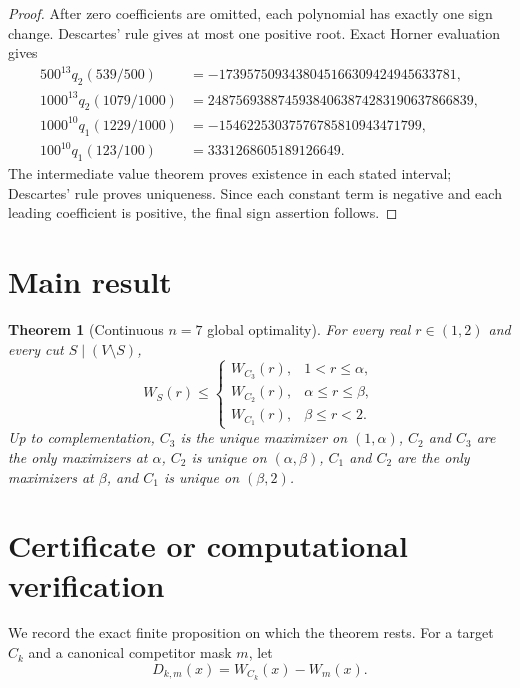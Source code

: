 \documentclass[11pt]{amsart}
\newtheorem{theorem}{Theorem}[section]
\theoremstyle{definition}
\begin{document}
\begin{proof}
After zero coefficients are omitted, each polynomial has exactly one sign
change.  Descartes' rule gives at most one positive root.  Exact Horner
evaluation gives
\begin{align*}
500^{13}q_2(539/500)
 &=-1739575093438045166309424945633781,\\
1000^{13}q_2(1079/1000)
 &=24875693887459384063874283190637866839,\\
1000^{10}q_1(1229/1000)
 &=-15462253037576785810943471799,\\
100^{10}q_1(123/100)
 &=3331268605189126649.
\end{align*}
The intermediate value theorem proves existence in each stated interval;
Descartes' rule proves uniqueness.  Since each constant term is negative and
each leading coefficient is positive, the final sign assertion follows.
\end{proof}

\section{Main result}

\begin{theorem}[Continuous $n=7$ global optimality]\label{thm:main}
For every real $r\in(1,2)$ and every cut $S\mid(V\setminus S)$,
\[
W_S(r)\le
\begin{cases}
W_{C_3}(r),&1<r\le\alpha,\\
W_{C_2}(r),&\alpha\le r\le\beta,\\
W_{C_1}(r),&\beta\le r<2.
\end{cases}
\]
Up to complementation, $C_3$ is the unique maximizer on $(1,\alpha)$,
$C_2$ and $C_3$ are the only maximizers at $\alpha$, $C_2$ is unique on
$(\alpha,\beta)$, $C_1$ and $C_2$ are the only maximizers at $\beta$, and
$C_1$ is unique on $(\beta,2)$.
\end{theorem}

\section{Certificate or computational verification}

We record the exact finite proposition on which the theorem rests.  For a
target $C_k$ and a canonical competitor mask $m$, let
\[
 D_{k,m}(x)=W_{C_k}(x)-W_m(x).
\]
\end{document}
